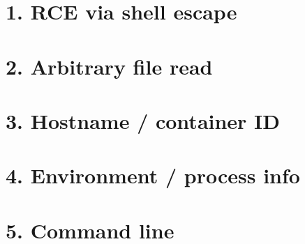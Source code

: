 \documentclass{article}
\begin{document}
\section*{1. RCE via shell escape}
\immediate{}
\immediate{}



\section*{2. Arbitrary file read}


\section*{3. Hostname / container ID}


\section*{4. Environment / process info}


\section*{5. Command line}

\end{document}
